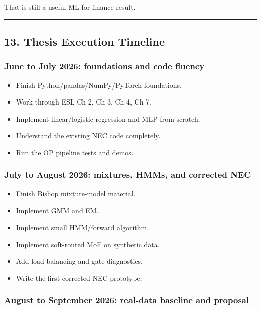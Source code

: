 That is still a useful ML-for-finance result.

\begin{center}\rule{0.5\linewidth}{0.5pt}\end{center}

\subsection{13. Thesis Execution
Timeline}\label{thesis-execution-timeline}

\subsubsection{June to July 2026: foundations and code
fluency}\label{june-to-july-2026-foundations-and-code-fluency}

\begin{itemize}
\tightlist
\item
  Finish Python/pandas/NumPy/PyTorch foundations.
\item
  Work through ESL Ch 2, Ch 3, Ch 4, Ch 7.
\item
  Implement linear/logistic regression and MLP from scratch.
\item
  Understand the existing NEC code completely.
\item
  Run the OP pipeline tests and demos.
\end{itemize}

\subsubsection{July to August 2026: mixtures, HMMs, and corrected
NEC}\label{july-to-august-2026-mixtures-hmms-and-corrected-nec}

\begin{itemize}
\tightlist
\item
  Finish Bishop mixture-model material.
\item
  Implement GMM and EM.
\item
  Implement small HMM/forward algorithm.
\item
  Implement soft-routed MoE on synthetic data.
\item
  Add load-balancing and gate diagnostics.
\item
  Write the first corrected NEC prototype.
\end{itemize}

\subsubsection{August to September 2026: real-data baseline and
proposal}\label{august-to-september-2026-real-data-baseline-and-proposal}

